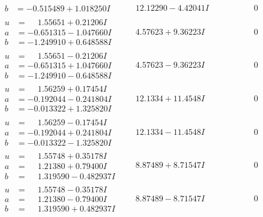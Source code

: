 \documentclass[1p]{elsarticle_modified}
\theoremstyle{definition}
\begin{document}
$$\begin{array}{c|c|c}
\begin{aligned}
b &= -0.515489 + 1.018250 I\end{aligned}
 & \phantom{-}12.12290 - 4.42041 I & \phantom{-0.000000 } 0 \\ \hline\begin{aligned}
u &= \phantom{-}1.55651 + 0.21206 I \\
a &= -0.651315 - 1.047660 I \\
b &= -1.249910 + 0.648588 I\end{aligned}
 & \phantom{-}4.57623 + 9.36223 I & \phantom{-0.000000 } 0 \\ \hline\begin{aligned}
u &= \phantom{-}1.55651 - 0.21206 I \\
a &= -0.651315 + 1.047660 I \\
b &= -1.249910 - 0.648588 I\end{aligned}
 & \phantom{-}4.57623 - 9.36223 I & \phantom{-0.000000 } 0 \\ \hline\begin{aligned}
u &= \phantom{-}1.56259 + 0.17454 I \\
a &= -0.192044 - 0.241804 I \\
b &= -0.013322 + 1.325820 I\end{aligned}
 & \phantom{-}12.1334 + 11.4548 I & \phantom{-0.000000 } 0 \\ \hline\begin{aligned}
u &= \phantom{-}1.56259 - 0.17454 I \\
a &= -0.192044 + 0.241804 I \\
b &= -0.013322 - 1.325820 I\end{aligned}
 & \phantom{-}12.1334 - 11.4548 I & \phantom{-0.000000 } 0 \\ \hline\begin{aligned}
u &= \phantom{-}1.55748 + 0.35178 I \\
a &= \phantom{-}1.21380 + 0.79400 I \\
b &= \phantom{-}1.319590 - 0.482937 I\end{aligned}
 & \phantom{-}8.87489 + 8.71547 I & \phantom{-0.000000 } 0 \\ \hline\begin{aligned}
u &= \phantom{-}1.55748 - 0.35178 I \\
a &= \phantom{-}1.21380 - 0.79400 I \\
b &= \phantom{-}1.319590 + 0.482937 I\end{aligned}
 & \phantom{-}8.87489 - 8.71547 I & \phantom{-0.000000 } 0 \\ \hline\begin{aligned}

\end{aligned}
\end{array}$$
\end{document}
